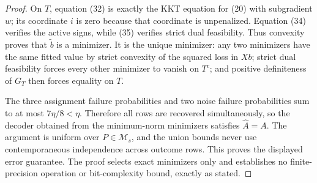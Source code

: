 \documentclass{article}
\begin{document}
\begin{proof}
On \(T\), equation (32) is exactly the KKT equation for (20) with subgradient \(w\); its coordinate \(i\) is zero because that coordinate is unpenalized.  Equation (34) verifies the active signs, while (35) verifies strict dual feasibility.  Thus convexity proves that \(\widetilde b\) is a minimizer.  It is the unique minimizer: any two minimizers have the same fitted value by strict convexity of the squared loss in \(Xb\); strict dual feasibility forces every other minimizer to vanish on \(T^c\); and positive definiteness of \(G_T\) then forces equality on \(T\).

The three assignment failure probabilities and two noise failure probabilities sum to at most \(7\eta/8<\eta\).  Therefore all rows are recovered simultaneously, so the decoder obtained from the minimum-norm minimizers satisfies \(\widehat A=A\).  The argument is uniform over \(P\in\mathcal M_s\), and the union bounds never use contemporaneous independence across outcome rows.  This proves the displayed error guarantee.  The proof selects exact minimizers only and establishes no finite-precision operation or bit-complexity bound, exactly as stated.
\end{proof}
\end{document}
